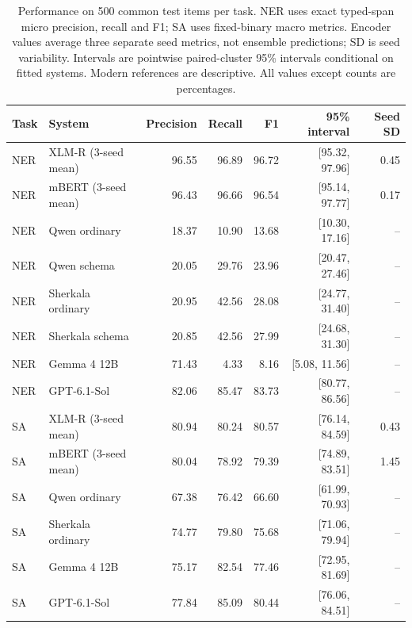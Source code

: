 \begin{table}[t]
\centering\footnotesize
\caption{Performance on 500 common test items per task. NER uses exact typed-span micro precision, recall and F1; SA uses fixed-binary macro metrics. Encoder values average three separate seed metrics, not ensemble predictions; SD is seed variability. Intervals are pointwise paired-cluster 95\% intervals conditional on fitted systems. Modern references are descriptive. All values except counts are percentages.}
\label{tab:final_main}
\begin{tabular}{llrrrrr}
\toprule
Task & System & Precision & Recall & F1 & 95\% interval & Seed SD\\
\midrule
NER & XLM-R (3-seed mean) & 96.55 & 96.89 & 96.72 & [95.32, 97.96] & 0.45\\
NER & mBERT (3-seed mean) & 96.43 & 96.66 & 96.54 & [95.14, 97.77] & 0.17\\
NER & Qwen ordinary & 18.37 & 10.90 & 13.68 & [10.30, 17.16] & --\\
NER & Qwen schema & 20.05 & 29.76 & 23.96 & [20.47, 27.46] & --\\
NER & Sherkala ordinary & 20.95 & 42.56 & 28.08 & [24.77, 31.40] & --\\
NER & Sherkala schema & 20.85 & 42.56 & 27.99 & [24.68, 31.30] & --\\
NER & Gemma 4 12B & 71.43 & 4.33 & 8.16 & [5.08, 11.56] & --\\
NER & GPT-6.1-Sol & 82.06 & 85.47 & 83.73 & [80.77, 86.56] & --\\
\midrule
SA & XLM-R (3-seed mean) & 80.94 & 80.24 & 80.57 & [76.14, 84.59] & 0.43\\
SA & mBERT (3-seed mean) & 80.04 & 78.92 & 79.39 & [74.89, 83.51] & 1.45\\
SA & Qwen ordinary & 67.38 & 76.42 & 66.60 & [61.99, 70.93] & --\\
SA & Sherkala ordinary & 74.77 & 79.80 & 75.68 & [71.06, 79.94] & --\\
SA & Gemma 4 12B & 75.17 & 82.54 & 77.46 & [72.95, 81.69] & --\\
SA & GPT-6.1-Sol & 77.84 & 85.09 & 80.44 & [76.06, 84.51] & --\\
\bottomrule
\end{tabular}
\end{table}
